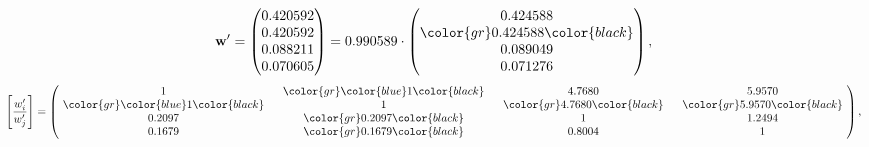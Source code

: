 \begin{example}
\begin{equation*}
\mathbf{w}^{\prime} =
\begin{pmatrix}
0.420592\\
0.420592\\
0.088211\\
0.070605
\end{pmatrix} =
0.990589\cdot
\begin{pmatrix}
0.424588\\
\color{gr} 0.424588\color{black} \\
0.089049\\
0.071276
\end{pmatrix},
\end{equation*}
\begin{equation*}
\left[ \frac{{w}^{\prime}_i}{{w}^{\prime}_j} \right] =
\begin{pmatrix}
$\,\,$ 1 $\,\,$ & $\,\,$\color{gr} \color{blue} 1\color{black} $\,\,$ & $\,\,$4.7680$\,\,$ & $\,\,$5.9570$\,\,$ \\
$\,\,$\color{gr} \color{blue} 1\color{black} $\,\,$ & $\,\,$ 1 $\,\,$ & $\,\,$\color{gr} 4.7680\color{black} $\,\,$ & $\,\,$\color{gr} 5.9570\color{black}   $\,\,$ \\
$\,\,$0.2097$\,\,$ & $\,\,$\color{gr} 0.2097\color{black} $\,\,$ & $\,\,$ 1 $\,\,$ & $\,\,$1.2494 $\,\,$ \\
$\,\,$0.1679$\,\,$ & $\,\,$\color{gr} 0.1679\color{black} $\,\,$ & $\,\,$0.8004$\,\,$ & $\,\,$ 1  $\,\,$ \\
\end{pmatrix},
\end{equation*}
\end{example}
\newpage
